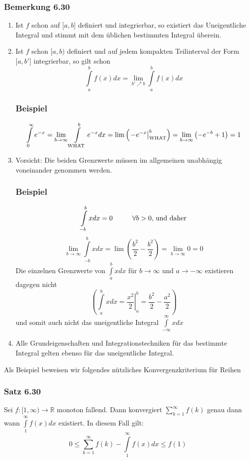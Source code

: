  \subsubsection*{Bemerkung 6.30}
\begin{enumerate}
\item Ist $f$ schon auf $\lbrack a,b\rbrack$ definiert und integrierbar, so existiert das Uneigentliche Integral und stimmt mit dem üblichen bestimmten Integral überein.
\item Ist $f$ schon $\lbrack a,b)$ definiert und auf jedem kompakten Teilinterval der Form $\lbrack a,b'\rbrack$ integrierbar, so gilt schon  \[\int\limits_a^b {f(x)dx = \mathop {\lim }\limits_{b' \nearrow b} } \int\limits_a^b {f(x)dx} \]
\subsubsection*{Beispiel}
\[\int\limits_0^\infty  {{e^{ - x}}}  = \mathop {\lim }\limits_{b \to \infty } \int\limits_{{\rm{WHAT}}}^b {{e^{ - x}}dx}  = \lim \left( {\left. { - {e^{ - x}}} \right|_{{\rm{WHAT}}}^b} \right) = \mathop {\lim }\limits_{b \to \infty } \left( { - {e^{ - b}} + 1} \right) = 1\]
\item Vorsicht: Die beiden Grenzwerte müssen im allgemeinen unabhängig voneinander genommen werden. 
\subsubsection*{Beispiel}
\[\int\limits_{ - b}^b {xdx = 0} \text{\hspace{10mm}}\forall b>0\text{, und daher}\]
\[\mathop {\lim }\limits_{b \to \infty } \int\limits_{ - b}^b {xdx = \lim \left( {\frac{{{b^2}}}{2} - \frac{{{b^2}}}{2}} \right) = \mathop {\lim }\limits_{b \to \infty } 0 = 0} \]
Die einzelnen Grenzwerte von $\int\limits_a^b {xdx} $ für $b\rightarrow \infty$ und $a\rightarrow -\infty$ existieren dagegen nicht \[\left( {\int\limits_a^b {xdx = \left. {\frac{{{x^2}}}{2}} \right|_a^b = \frac{{{b^2}}}{2} - \frac{{{a^2}}}{2}} } \right)\] und somit auch nicht das uneigentliche Integral $\int\limits_{ - \infty }^\infty  {xdx} $
\item Alle Grundeigenschaften und Integrationstechniken für das bestimmte Integral gelten ebenso für das uneigentliche Integral. 
\end{enumerate}
Als Beispiel beweisen wir folgendes nützliches Konvergenzkriterium für Reihen
\subsubsection*{Satz 6.30}
Sei $f:\lbrack 1,\infty )\rightarrow \mathbb{R}$ monoton fallend. Dann konvergiert $\sum\limits_{k = 1}^\infty  {f(k)}$ genau dann wann $\int\limits_1^\infty  {f(x)dx} $ existiert. In diesem Fall gilt: \[0 \le \sum\limits_{k = 1}^\infty  {f(k)}  - \int\limits_1^\infty  {f(x)dx}  \le f(1)\]
